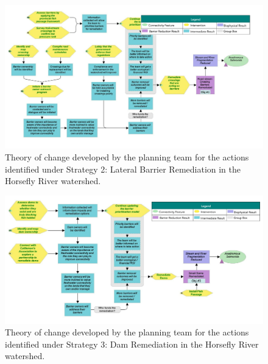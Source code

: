 \documentclass[
  letterpaper,
  DIV=11,
  numbers=noendperiod]{scrreprt}
\begin{document}
\begin{figure}

{\centering \includegraphics{images/figure4.png}

}

\caption{\label{fig-stra2}Theory of change developed by the planning
team for the actions identified under Strategy 2: Lateral Barrier
Remediation in the Horsefly River watershed.}

\end{figure}

\begin{figure}

{\centering \includegraphics{images/figure6.png}

}

\caption{\label{fig-stra3}Theory of change developed by the planning
team for the actions identified under Strategy 3: Dam Remediation in the
Horsefly River watershed.}

\end{figure}
\end{document}
